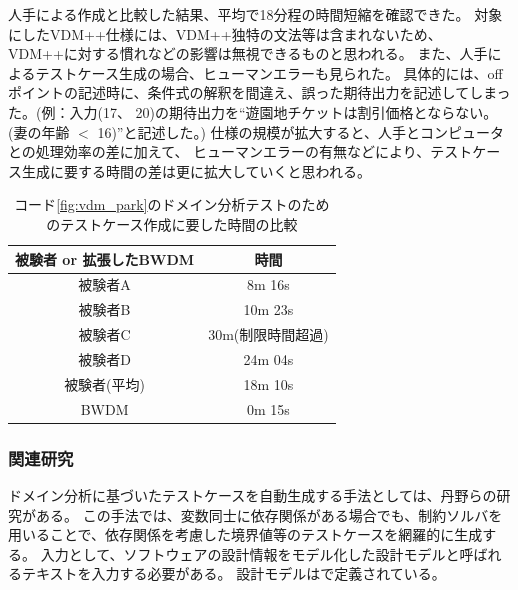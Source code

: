 \documentclass[uplatex, report, a4j, 10pt]{jsbook}
\begin{document}
人手による作成と比較した結果、平均で18分程の時間短縮を確認できた。
対象にしたVDM++仕様には、VDM++独特の文法等は含まれないため、
VDM++に対する慣れなどの影響は無視できるものと思われる。
また、人手によるテストケース生成の場合、ヒューマンエラーも見られた。
具体的には、offポイントの記述時に、条件式の解釈を間違え、誤った期待出力を記述してしまった。(例：入力(17、 20)の期待出力を“遊園地チケットは割引価格とならない。(妻の年齢 $<$ 16)”と記述した。)
仕様の規模が拡大すると、人手とコンピュータとの処理効率の差に加えて、
ヒューマンエラーの有無などにより、テストケース生成に要する時間の差は更に拡大していくと思われる。

\begin{table}[t]
  \begin{center}
    \caption{コード\ref{fig:vdm_park}のドメイン分析テストのためのテストケース作成に要した時間の比較}
    \label{tab:time}
    \begin{tabular}{c|c}
      被験者 or 拡張したBWDM & 時間              \\
      \hline
      \hline
      被験者A                & 8m 16s            \\ \hline
      被験者B                & 10m 23s           \\ \hline
      被験者C                & 30m(制限時間超過) \\ \hline
      被験者D                & 24m 04s           \\ \hline
      被験者(平均)           & 18m 10s           \\ \hline
      BWDM                   & 0m 15s
    \end{tabular}
  \end{center}
\end{table}

\subsubsection{関連研究}

ドメイン分析に基づいたテストケースを自動生成する手法としては、丹野らの研究\cite{sekkeiModel}がある。
この手法では、変数同士に依存関係がある場合でも、制約ソルバ\cite{sat}を用いることで、依存関係を考慮した境界値等のテストケースを網羅的に生成する。
入力として、ソフトウェアの設計情報をモデル化した設計モデルと呼ばれるテキストを入力する必要がある。
設計モデルは\cite{sekkeiModel}で定義されている。
\end{document}
